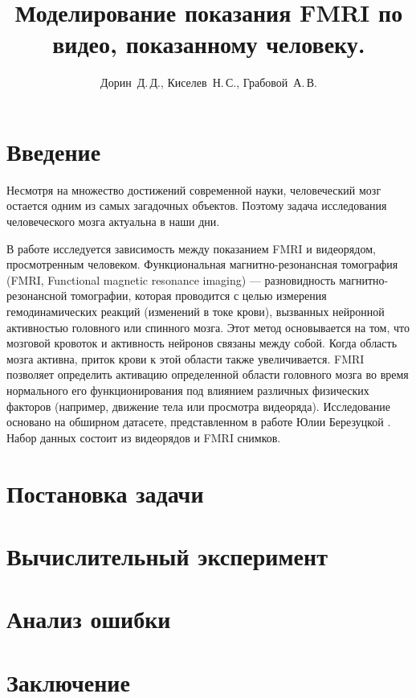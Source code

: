 \documentclass[12pt,twoside]{article}
\title
    [Моделирование показания FMRI по видео, показанному человеку] %
    {Моделирование показания FMRI по видео, показанному человеку.}
\author
    [Дорин~Д.\,Д.] %
    {Дорин~Д.\,Д., Киселев~Н.\,С., Грабовой~А.\,В.} %
    [Дорин~Д.\,Д.$^{1,2}$, Киселев~Н.\,С.$^{1,2}$, Грабовой~А.\,В.$^2$] %
\begin{document}
\maketitle
\section{Введение}
Несмотря на множество достижений современной науки, человеческий мозг остается одним из самых загадочных объектов. 
Поэтому задача исследования человеческого мозга актуальна в наши дни.

В работе исследуется зависимость между показанием FMRI и видеорядом, просмотренным человеком.
Функциональная магнитно-резонансная томография (FMRI, Functional magnetic resonance imaging) — разновидность 
магнитно-резонансной томографии, которая проводится с целью измерения гемодинамических реакций (изменений в токе крови), 
вызванных нейронной активностью головного или спинного мозга.
Этот метод основывается на том, что мозговой кровоток и активность нейронов связаны между собой.
Когда область мозга активна, приток крови к этой области также увеличивается.
FMRI позволяет определить активацию определенной области головного мозга во время нормального 
его функционирования под влиянием различных физических факторов (например, движение тела или просмотра видеоряда).
Исследование основано на обширном датасете, представленном в работе Юлии Березуцкой \citep{Berezutskaya2022}.
Набор данных состоит из видеорядов и FMRI снимков.

\section{Постановка задачи}

\section{Вычислительный эксперимент}


\section{Анализ ошибки}

\section{Заключение}




\end{document}

